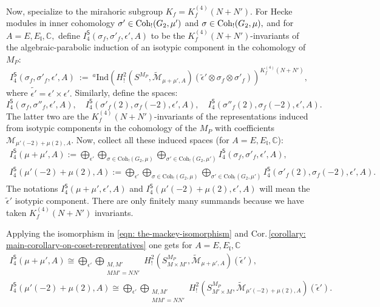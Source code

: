 \documentclass[11pt]{amsart}
\newcommand{\mirf}[1]{K_f^{(4)}(#1)}
\begin{document}
Now, specialize to the mirahoric subgroup $K_f = \mirf{N+N'}.$  For Hecke modules in inner cohomology 
$\sigma' \in \textup{Coh}_!(G_2,\mu')$ and $\sigma \in \textup{Coh}_!(G_2, \mu),$ 
and for $A = E, E_\mathfrak{l}, \mathbb{C},$ define 
$I_4^\mathsf{S}(\sigma_f, \sigma'_f, \epsilon',A)$ to be the $\mirf{N+N'}$-invariants of the algebraic-parabolic induction of 
an isotypic component in the cohomology of $M_P$:
\begin{equation}
\label{eqn:I-sigma-sigma'}
	I_4^\mathsf{S}(\sigma_f, \sigma'_f, \epsilon',A) \ := \ 
	{^a}\text{Ind}\left(H^2_{!}(S^{M_P}, \widetilde{\mathcal{M}}_{\mu+\mu',A})(\tilde{\epsilon}'\otimes \sigma_f \otimes \sigma'_f)\right)^{\mirf{N+N'}},
\end{equation}
where $\tilde{\epsilon'} = \epsilon'\times\epsilon'.$  
Similarly, define the spaces: 
$$
I_4^\mathsf{S}(\sigma_f, \sigma''_f, \epsilon',A), \quad I_4^\mathsf{S}(\sigma'_f(2), \sigma_f(-2), \epsilon',A), 
\quad 
I_4^\mathsf{S}(\sigma''_f(2), \sigma_f(-2), \epsilon',A).
$$ 
The latter two are the $\mirf{N+N'}$-invariants of the representations induced from isotypic components in the cohomology of the $M_P$ with 
coefficients $\mathcal{M}_{\mu'(-2) + \mu(2), A}.$ 
Now, collect all these induced spaces (for $A = E, E_\mathfrak{l}, \mathbb{C}$): 
\begin{gather*} 
	I_4^\mathsf{S}(\mu+\mu', A) := \bigoplus_{\epsilon'}\bigoplus_{\sigma \in \text{Coh}_!(G_2,\mu)} 
	\bigoplus_{\sigma' \in \text{Coh}_!(G_2,\mu')} I_4^\mathsf{S}(\sigma_f, \sigma'_f, \epsilon',A),\\
	I_4^\mathsf{S}(\mu'(-2) + \mu(2), A) := \bigoplus_{\epsilon'}\bigoplus_{\sigma \in \text{Coh}_!(G_2,\mu)} 
	\bigoplus_{\sigma' \in \text{Coh}_!(G_2,\mu')} I_4^\mathsf{S}(\sigma'_f(2), \sigma_f(-2), \epsilon',A ).
\end{gather*}
The notations $I_4^\mathsf{S}(\mu + \mu', \epsilon', A)$ and $I_4^\mathsf{S}(\mu'(-2)+\mu(2), \epsilon', A)$ will mean the $\tilde{\epsilon}'$ isotypic component. 
There are only finitely many summands because we have taken $\mirf{N+N'}$ invariants.

\smallskip

Applying the isomorphism in \eqref{eqn: the-mackey-isomorphism} and Cor.\,\ref{corollary: main-corollary-on-coset-reprentatives} 
one gets for $A = E, E_\mathfrak{l}, \mathbb{C}$
\begin{gather*}
	I_4^\mathsf{S}(\mu+\mu', A) \cong \bigoplus_{\epsilon'}\bigoplus_{\substack{M, M' \\ MM' = NN'}} H_{!}^2(S^{M_P}_{M\times M'}, \widetilde{\mathcal{M}}_{\mu+\mu', A})(\tilde{\epsilon}'),\\
		I_4^\mathsf{S}(\mu'(-2) + \mu(2), A) \cong \bigoplus_{\epsilon'} \bigoplus_{\substack{M, M' \\ MM' = NN'}} H_{!}^2(S^{M_P}_{M'\times M}, \widetilde{\mathcal{M}}_{\mu'(-2) + \mu(2), A})(\tilde{\epsilon}').
\end{gather*}
\end{document}

